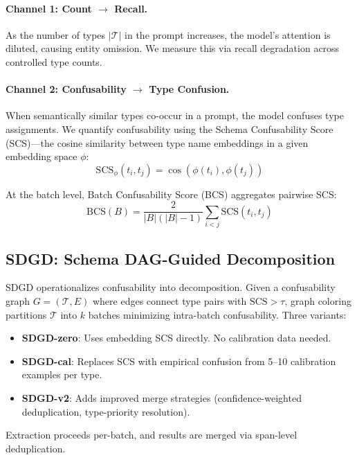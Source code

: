 \documentclass[11pt,a4paper]{article}
\begin{document}
\paragraph{Channel 1: Count $\rightarrow$ Recall.} As the number of types $|\mathcal{T}|$ in the prompt increases, the model's attention is diluted, causing entity omission. We measure this via recall degradation across controlled type counts.

\paragraph{Channel 2: Confusability $\rightarrow$ Type Confusion.} When semantically similar types co-occur in a prompt, the model confuses type assignments. We quantify confusability using the Schema Confusability Score (SCS)---the cosine similarity between type name embeddings in a given embedding space $\phi$:
\begin{equation}
\text{SCS}_\phi(t_i, t_j) = \cos(\phi(t_i), \phi(t_j))
\end{equation}

At the batch level, Batch Confusability Score (BCS) aggregates pairwise SCS:
\begin{equation}
\text{BCS}(B) = \frac{2}{|B|(|B|-1)} \sum_{i<j} \text{SCS}(t_i, t_j)
\end{equation}

\subsection{SDGD: Schema DAG-Guided Decomposition}

SDGD operationalizes confusability into decomposition. Given a confusability graph $G{=}(\mathcal{T}, E)$ where edges connect type pairs with $\text{SCS} > \tau$, graph coloring partitions $\mathcal{T}$ into $k$ batches minimizing intra-batch confusability. Three variants:

\begin{itemize}
\item \textbf{SDGD-zero}: Uses embedding SCS directly. No calibration data needed.
\item \textbf{SDGD-cal}: Replaces SCS with empirical confusion from 5--10 calibration examples per type.
\item \textbf{SDGD-v2}: Adds improved merge strategies (confidence-weighted deduplication, type-priority resolution).
\end{itemize}

Extraction proceeds per-batch, and results are merged via span-level deduplication.
\end{document}
